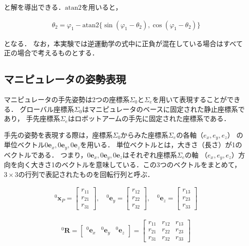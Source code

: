 と解を導出できる．$\text{atan2}$を用いると，

\begin{align}
  \theta_2 = \varphi_1 - \text{atan2} \{ \sin(\varphi_1 - \theta_2), \cos(\varphi_1 - \theta_2) \} \tag{2.14}
\end{align}

となる．
なお，本実験では逆運動学の式中に正負が混在している場合はすべて正の場合で考えるものとする．



\subsection{マニピュレータの姿勢表現}
マニピュレータの手先姿勢は2つの座標系$\Sigma_0$と$\Sigma_e$を用いて表現することができる．
グローバル座標系$\Sigma_0$はマニピュレータのベースに固定された静止座標系であり，
手先座標系$\Sigma_e$はロボットアームの手先に固定された座標系である．

手先の姿勢を表現する際は，座標系$\Sigma_0$からみた座標系$\Sigma_e$の各軸（$e_x, e_y, e_z$）
の単位ベクトル$0\mathbf{e}_x, 0\mathbf{e}_y, 0\mathbf{e}_z$を用いる．
単位ベクトルとは，大きさ（長さ）が1のベクトルである．
つまり，$0\mathbf{e}_x, 0\mathbf{e}_y, 0\mathbf{e}_z$はそれぞれ座標系$\Sigma_e$の軸
（$e_x, e_y, e_z$）方向を向く大きさ1のベクトルを意味している．この3つのベクトルをまとめて，
$3 \times 3$の行列で表記されたものを回転行列と呼ぶ．

\begin{align}
  ^0\mathbf{x}_{P} = \begin{bmatrix} r_{11} \\ r_{21} \\ r_{31} \end{bmatrix}, \quad ^0\mathbf{e}_y = \begin{bmatrix} r_{12} \\ r_{22} \\ r_{32} \end{bmatrix}, \quad ^0\mathbf{e}_z = \begin{bmatrix} r_{13} \\ r_{23} \\ r_{33} \end{bmatrix}
\end{align}

\begin{align}
  ^0\mathbf{R} = \begin{bmatrix} ^0\mathbf{e}_x & ^0\mathbf{e}_y & ^0\mathbf{e}_z \end{bmatrix} = \begin{bmatrix} r_{11} & r_{12} & r_{13} \\ r_{21} & r_{22} & r_{23} \\ r_{31} & r_{32} & r_{33} \end{bmatrix} \tag{2.16}
\end{align}

